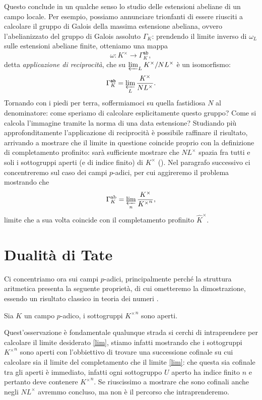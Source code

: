 Questo conclude in un qualche senso lo studio delle estensioni abeliane di un campo locale. Per esempio, possiamo annunciare trionfanti di essere riusciti a calcolare il gruppo di Galois della massima estensione abeliana, ovvero l'abelianizzato del gruppo di Galois assoluto $ \Gamma_K $: prendendo il limite inverso di $ \omega_L $ sulle estensioni abeliane finite, otteniamo una mappa
\[ \omega\colon K^\times \to \Gamma_K^{\texttt{ab}}, \]
detta \emph{applicazione di reciprocità}, che su $ \varprojlim_L K^\times / NL^\times  $ è un isomorfismo:
\begin{equation}\label{lim}
	\Gamma_K^{\texttt{ab}} = \varprojlim_L \frac{K^\times}{NL^\times}.
\end{equation}
Tornando con i piedi per terra, soffermiamoci su quella fastidiosa $ N $ al denominatore: come speriamo di calcolare esplicitamente questo gruppo? Come si calcola l'immagine tramite la norma di una data estensione? Studiando più approfonditamente l'applicazione di reciprocità è possibile raffinare il risultato, arrivando a mostrare che il limite in questione coincide proprio con la definizione di completamento profinito: sarà sufficiente mostrare che $ NL^\times $ spazia fra tutti e soli i sottogruppi aperti (e di indice finito) di $ K^\times $ (\cite[XIV.\S 6.1]{SerreFields}). Nel paragrafo successivo ci concentreremo sul caso dei campi $ p $-adici, per cui aggireremo il problema mostrando che
\[ \Gamma^\text{ab}_K = \varprojlim_n \frac{K^\times}{{K^\times}^n}, \]
limite che a sua volta coincide con il completamento profinito $ \hat{K}^\times $.

\section{Dualità di Tate}
Ci concentriamo ora sui campi $ p $-adici, principalmente perché la struttura aritmetica presenta la seguente proprietà, di cui ometteremo la dimostrazione, essendo un risultato classico in teoria dei numeri \cite[proposizione 4.11]{Harari}.

\begin{proposition}
	Sia $ K $ un campo $ p $-adico, i sottogruppi $ {K^\times}^n $ sono aperti.
\end{proposition}

Quest'osservazione è fondamentale qualunque strada si cerchi di intraprendere per calcolare il limite desiderato \eqref{lim}, stiamo infatti mostrando che i sottogruppi $ {K^\times}^n $ sono aperti con l'obbiettivo di trovare una successione cofinale su cui calcolare sia il limite del completamento che il limite \eqref{lim}: che questa sia cofinale tra gli aperti è immediato, infatti ogni sottogruppo $ U $ aperto ha indice finito $ n $ e pertanto deve contenere $ {K^\times}^n $. Se riuscissimo a mostrare che sono cofinali anche negli $ NL^\times $ avremmo concluso, ma non è il percorso che intraprenderemo.

